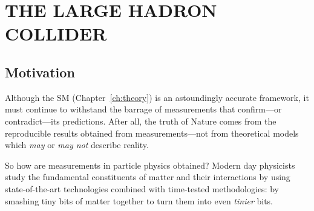\chapter{THE LARGE HADRON COLLIDER}

\section{Motivation}
Although the SM (Chapter~\ref{ch:theory}) is an astoundingly accurate framework, it must continue to withstand the barrage of measurements that confirm---or contradict---its predictions.
After all, the truth of Nature comes from the reproducible results obtained from measurements---not from theoretical models which \emph{may} or \emph{may not} describe reality.

So how are measurements in particle physics obtained?
Modern day physicists study the fundamental constituents of matter and their interactions by using state-of-the-art technologies combined with time-tested methodologies:
by smashing tiny bits of matter together to turn them into even \emph{tinier} bits.

